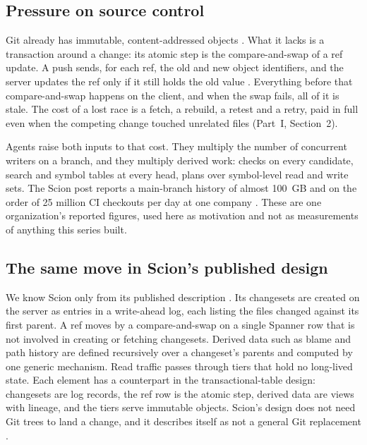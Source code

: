 \documentclass[11pt,letterpaper]{article}
\theoremstyle{definition}
\theoremstyle{remark}
\begin{document}
\subsection{Pressure on source control}

Git already has immutable, content-addressed objects \cite{gitobjects}. What it lacks is a transaction around a change: its atomic step is the compare-and-swap of a ref update. A push sends, for each ref, the old and new object identifiers, and the server updates the ref only if it still holds the old value \cite{gitprotocol}. Everything before that compare-and-swap happens on the client, and when the swap fails, all of it is stale. The cost of a lost race is a fetch, a rebuild, a retest and a retry, paid in full even when the competing change touched unrelated files (Part~I, Section~2).

Agents raise both inputs to that cost. They multiply the number of concurrent writers on a branch, and they multiply derived work: checks on every candidate, search and symbol tables at every head, plans over symbol-level read and write sets. The Scion post reports a main-branch history of almost 100~GB and on the order of 25 million CI checkouts per day at one company \cite{anthropic2026scion}. %
These are one organization's reported figures, used here as motivation and not as measurements of anything this series built.

\subsection{The same move in Scion's published design}

We know Scion only from its published description \cite{anthropic2026scion}. Its changesets are created on the server as entries in a write-ahead log, each listing the files changed against its first parent. A ref moves by a compare-and-swap on a single Spanner row that is not involved in creating or fetching changesets. Derived data such as blame and path history are defined recursively over a changeset's parents and computed by one generic mechanism. Read traffic passes through tiers that hold no long-lived state. Each element has a counterpart in the transactional-table design: changesets are log records, the ref row is the atomic step, derived data are views with lineage, and the tiers serve immutable objects. Scion's design does not need Git trees to land a change, and it describes itself as not a general Git replacement \cite{anthropic2026scion}.
\end{document}
